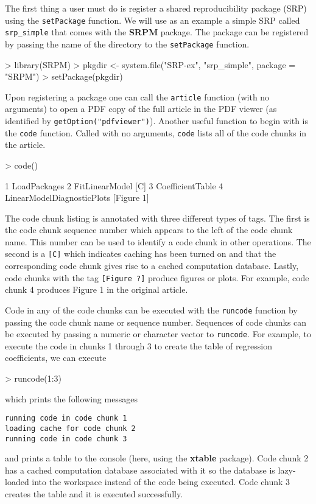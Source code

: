 \documentclass{article}
\newcommand{\code}{\texttt}
\newcommand{\pkg}{\textbf}
\begin{document}
The first thing a user must do is register a shared reproducibility
package (SRP) using the \code{setPackage} function.  We will use as an
example a simple SRP called \code{srp\_simple} that comes with the
\pkg{SRPM} package.  The package can be registered by passing the name
of the directory to the \code{setPackage} function.
\begin{Schunk}
\begin{Sinput}
> library(SRPM)
> pkgdir <- system.file("SRP-ex", "srp_simple", package = "SRPM")
> setPackage(pkgdir)
\end{Sinput}
\end{Schunk}
Upon registering a package one can call the \code{article} function
(with no arguments) to open a PDF copy of the full article in the PDF
viewer (as identified by \code{getOption("pdfviewer")}).  Another
useful function to begin with is the \code{code} function.  Called
with no arguments, \code{code} lists all of the code chunks in the
article.
\begin{Schunk}
\begin{Sinput}
> code()
\end{Sinput}
\begin{Soutput}
1 LoadPackages  
2 FitLinearModel  [C]
3 CoefficientTable  
4 LinearModelDiagnosticPlots [Figure 1] 
\end{Soutput}
\end{Schunk}

The code chunk listing is annotated with three different types of
tags.  The first is the code chunk sequence number which appears to
the left of the code chunk name.  This number can be used to identify
a code chunk in other operations.  The second is a \texttt{[C]} which
indicates caching has been turned on and that the corresponding code
chunk gives rise to a cached computation database.  Lastly, code
chunks with the tag \texttt{[Figure ?]} produce figures or plots.  For
example, code chunk 4 produces Figure 1 in the original article.


Code in any of the code chunks can be executed with the \code{runcode}
function by passing the code chunk name or sequence number.  Sequences
of code chunks can be executed by passing a numeric or character
vector to \code{runcode}.  For example, to execute the code in chunks
1 through 3 to create the table of regression coefficients, we can
execute
\begin{Schunk}
\begin{Sinput}
> runcode(1:3)
\end{Sinput}
\end{Schunk}
which prints the following messages
\begin{verbatim}
running code in code chunk 1
loading cache for code chunk 2
running code in code chunk 3
\end{verbatim}
and prints a table to the console (here, using the \pkg{xtable}
package).  Code chunk 2 has a cached computation database associated
with it so the database is lazy-loaded into the workspace instead of
the code being executed.  Code chunk 3 creates the table and it is
executed successfully.
\end{document}
